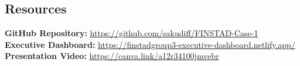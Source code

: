 \subsection*{Resources}

\textbf{GitHub Repository:} \url{https://github.com/sakudiff/FINSTAD-Case-1}\\
\textbf{Executive Dashboard:} \url{https://finstadgroup3-executive-dashboard.netlify.app/}\\
\textbf{Presentation Video:} \url{https://canva.link/a12r34100jmvebr}
